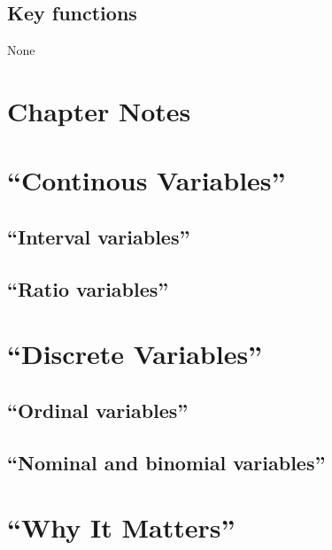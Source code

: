 \documentclass[]{book}
\theoremstyle{definition}
\theoremstyle{definition}
\theoremstyle{definition}
\theoremstyle{remark}
\begin{document}
\subsection{Key functions}\label{key-functions-3}

None

\section*{Chapter Notes}\label{chapter-notes-4}

\section{\texorpdfstring{``Continous
Variables''}{Continous Variables}}\label{continous-variables}

\subsection{\texorpdfstring{``Interval
variables''}{Interval variables}}\label{interval-variables}

\subsection{\texorpdfstring{``Ratio
variables''}{Ratio variables}}\label{ratio-variables}

\section{\texorpdfstring{``Discrete
Variables''}{Discrete Variables}}\label{discrete-variables}

\subsection{\texorpdfstring{``Ordinal
variables''}{Ordinal variables}}\label{ordinal-variables}

\subsection{\texorpdfstring{``Nominal and binomial
variables''}{Nominal and binomial variables}}\label{nominal-and-binomial-variables}

\section{\texorpdfstring{``Why It
Matters''}{Why It Matters}}\label{why-it-matters}
\end{document}
